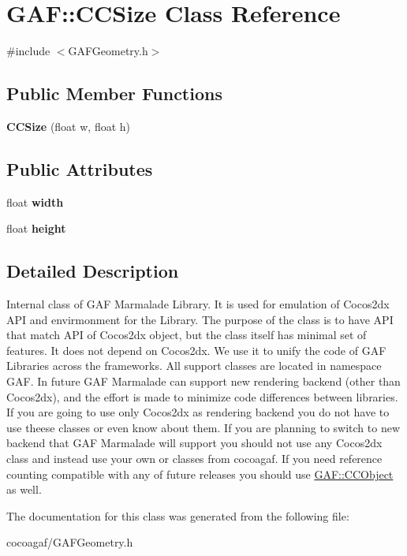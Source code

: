 \hypertarget{class_g_a_f_1_1_c_c_size}{\section{G\-A\-F\-:\-:C\-C\-Size Class Reference}
\label{class_g_a_f_1_1_c_c_size}
}


{\ttfamily \#include $<$G\-A\-F\-Geometry.\-h$>$}

\subsection*{Public Member Functions}
\begin{DoxyCompactItemize}
\item 
\hypertarget{class_g_a_f_1_1_c_c_size_a2ed4bb237cf3db7d19c4c403131dacd7}{{\bfseries C\-C\-Size} (float w, float h)}\label{class_g_a_f_1_1_c_c_size_a2ed4bb237cf3db7d19c4c403131dacd7}

\end{DoxyCompactItemize}
\subsection*{Public Attributes}
\begin{DoxyCompactItemize}
\item 
\hypertarget{class_g_a_f_1_1_c_c_size_a957274761169e02e8af661268a71e8b5}{float {\bfseries width}}\label{class_g_a_f_1_1_c_c_size_a957274761169e02e8af661268a71e8b5}

\item 
\hypertarget{class_g_a_f_1_1_c_c_size_a273c0fe58e5f33ee858f71c48a597347}{float {\bfseries height}}\label{class_g_a_f_1_1_c_c_size_a273c0fe58e5f33ee858f71c48a597347}

\end{DoxyCompactItemize}


\subsection{Detailed Description}
Internal class of G\-A\-F Marmalade Library. It is used for emulation of Cocos2dx A\-P\-I and envirmonment for the Library. The purpose of the class is to have A\-P\-I that match A\-P\-I of Cocos2dx object, but the class itself has minimal set of features. It does not depend on Cocos2dx. We use it to unify the code of G\-A\-F Libraries across the frameworks. All support classes are located in namespace G\-A\-F. In future G\-A\-F Marmalade can support new rendering backend (other than Cocos2dx), and the effort is made to minimize code differences between libraries. If you are going to use only Cocos2dx as rendering backend you do not have to use theese classes or even know about them. If you are planning to switch to new backend that G\-A\-F Marmalade will support you should not use any Cocos2dx class and instead use your own or classes from cocoagaf. If you need reference counting compatible with any of future releases you should use \hyperlink{class_g_a_f_1_1_c_c_object}{G\-A\-F\-::\-C\-C\-Object} as well. 

The documentation for this class was generated from the following file\-:\begin{DoxyCompactItemize}
\item 
cocoagaf/G\-A\-F\-Geometry.\-h\end{DoxyCompactItemize}

